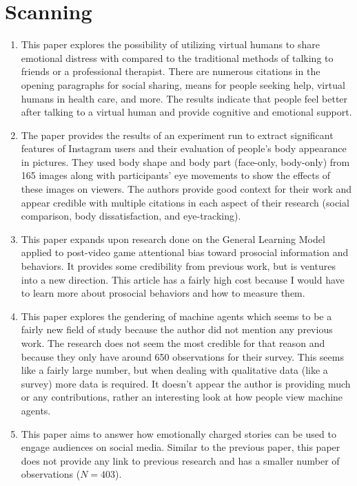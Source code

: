 \documentclass[a4paper]{article}
\begin{document}
\section{Scanning}
\begin{enumerate}
    \item This paper explores the possibility of utilizing virtual humans to share emotional distress with compared to the traditional methods of talking to friends or a professional therapist. There are numerous citations in the opening paragraphs for social sharing, means for people seeking help, virtual humans in health care, and more. The results indicate that people feel better after talking to a virtual human and provide cognitive and emotional support. \cite{pauw_avatar_2022}
    
    \item The paper provides the results of an experiment run to extract significant features of Instagram users and their evaluation of people's body appearance in pictures. They used body shape and body part (face-only, body-only) from 165 images along with participants' eye movements to show the effects of these images on viewers. The authors provide good context for their work and appear credible with multiple citations in each aspect of their research (social comparison, body dissatisfaction, and eye-tracking). \cite{scott_thinstagram_2023}
    
    \item This paper expands upon research done on the General Learning Model applied to post-video game attentional bias toward prosocial information and behaviors. It provides some credibility from previous work, but is ventures into a new direction. This article has a fairly high cost because I would have to learn more about prosocial behaviors and how to measure them. \cite{yin_effects_2022}
    
    \item This paper explores the gendering of machine agents which seems to be a fairly new field of study because the author did not mention any previous work. The research does not seem the most credible for that reason and because they only have around 650 observations for their survey. This seems like a fairly large number, but when dealing with qualitative data (like a survey) more data is required. It doesn't appear the author is providing much or any contributions, rather an interesting look at how people view machine agents. \cite{fortunati_is_2022}
    
    \item This paper aims to answer how emotionally charged stories can be used to engage audiences on social media. Similar to the previous paper, this paper does not provide any link to previous research and has a smaller number of observations ($N = 403$). \cite{zhao_primacy_2022}
    

\end{enumerate}
\end{document}

